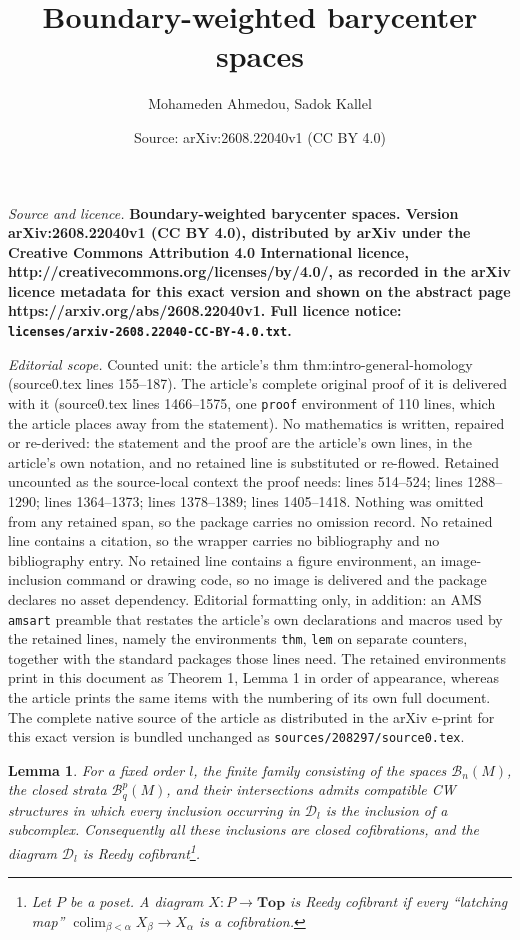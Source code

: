 \documentclass[10pt,a4paper]{amsart}
\title{\bfseries Boundary-weighted barycenter spaces}
\author{Mohameden Ahmedou, Sadok Kallel}
\date{Source: arXiv:2608.22040v1 (CC BY 4.0)}
\newtheorem{lem}{Lemma}
\newcommand{\BB}{\mathcal B}
\newcommand{\colim}{\operatorname*{colim}}
\begin{document}
\maketitle

\noindent\emph{Source and licence.} \bfseries Boundary-weighted barycenter spaces. Version arXiv:2608.22040v1 (CC BY 4.0), distributed by arXiv under the Creative Commons Attribution 4.0 International licence, http://creativecommons.org/licenses/by/4.0/, as recorded in the arXiv licence metadata for this exact version and shown on the abstract page https://arxiv.org/abs/2608.22040v1. Full licence notice: \texttt{licenses/arxiv-2608.22040-CC-BY-4.0.txt}.\par\smallskip

\noindent\textit{Editorial scope.} Counted unit: the article's thm thm:intro-general-homology (source0.tex lines 155--187). The article's complete original proof of it is delivered with it (source0.tex lines 1466--1575, one \texttt{proof} environment of 110 lines, which the article places away from the statement). No mathematics is written, repaired or re-derived: the statement and the proof are the article's own lines, in the article's own notation, and no retained line is substituted or re-flowed.  Retained uncounted as the source-local context the proof needs: lines 514--524; lines 1288--1290; lines 1364--1373; lines 1378--1389; lines 1405--1418.  Nothing was omitted from any retained span, so the package carries no omission record.  No retained line contains a citation, so the wrapper carries no bibliography and no bibliography entry.  No retained line contains a figure environment, an image-inclusion command or drawing code, so no image is delivered and the package declares no asset dependency.  Editorial formatting only, in addition: an AMS \texttt{amsart} preamble that restates the article's own declarations and macros used by the retained lines, namely the environments \texttt{thm}, \texttt{lem} on separate counters, together with the standard packages those lines need.  The retained environments print in this document as Theorem 1, Lemma 1 in order of appearance, whereas the article prints the same items with the numbering of its own full document.  The complete native source of the article as distributed in the arXiv e-print for this exact version is bundled unchanged as \texttt{sources/208297/source0.tex}.
\begin{lem}\label{lem:compatible-triangulations}
For a fixed order \(l\), the finite family consisting of the spaces
\(\BB_n(M)\), the closed strata \(\BB_q^p(M)\), and their intersections
admits compatible CW structures in which every inclusion occurring in
\(\mathcal D_l\) is the inclusion of a subcomplex. Consequently all these
inclusions are closed cofibrations, and the diagram \(\mathcal D_l\) is Reedy
cofibrant\footnote{Let $P$ be a poset. A diagram $
X\colon P\longrightarrow \mathbf{Top}
$
is Reedy cofibrant if every ``latching map'' $\colim_{\beta<\alpha}X_\beta\rightarrow X_\alpha$ is a  cofibration.}.
\end{lem}
\end{document}
